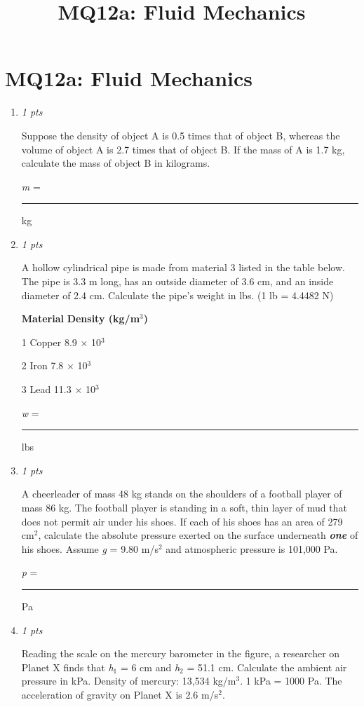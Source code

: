 \documentclass[11pt]{article}
\title{MQ12a: Fluid Mechanics}
\author{}
\date{}
\begin{document}
\maketitle

\section*{MQ12a: Fluid Mechanics}

\begin{enumerate}[leftmargin=*,label=\textbf{Question \arabic*.}]
\item \hfill \textit{1 pts}

Suppose the density of object A is 0.5 times that of object B, whereas the volume of object A is 2.7 times that of object B. If the mass of A is 1.7 kg, calculate the mass of object B in kilograms.



\emph{m }= \rule{2cm}{0.4pt} kg

\item \hfill \textit{1 pts}

A hollow cylindrical pipe is made from material 3 listed in the table below. The pipe is 3.3 m long, has an outside diameter of 3.6 cm, and an inside diameter of 2.4 cm. Calculate the pipe's weight in lbs. (1 lb = 4.4482 N)

\textbf{Material}
\textbf{Density (kg/m$^{3}$)}

1
Copper
8.9 × 10$^{3}$

2
Iron
7.8 × 10$^{3}$

3
Lead
11.3 × 10$^{3}$



\emph{w }= \rule{2cm}{0.4pt} lbs

\item \hfill \textit{1 pts}

A cheerleader of mass 48 kg stands on the shoulders of a football player of mass 86 kg. The football player is standing in a soft, thin layer of mud that does not permit air under his shoes. If each of his shoes has an area of 279 cm$^{2}$, calculate the absolute pressure exerted on the surface underneath \textbf{\emph{one}} of his shoes. Assume \emph{g} = 9.80 m/s$^{2}$ and atmospheric pressure is 101,000 Pa.



\emph{p} =\rule{2cm}{0.4pt}Pa

\item \hfill \textit{1 pts}

Reading the scale on the mercury barometer in the figure, a researcher on Planet X finds that \emph{h}$_{1}$ = 6 cm and \emph{h}$_{2}$ = 51.1 cm. Calculate the ambient air pressure in kPa. Density of mercury: 13,534 kg/m$^{3}$. 1 kPa = 1000 Pa. The acceleration of gravity on Planet X is 2.6 m/s$^{2}$.


\end{enumerate}
\end{document}
